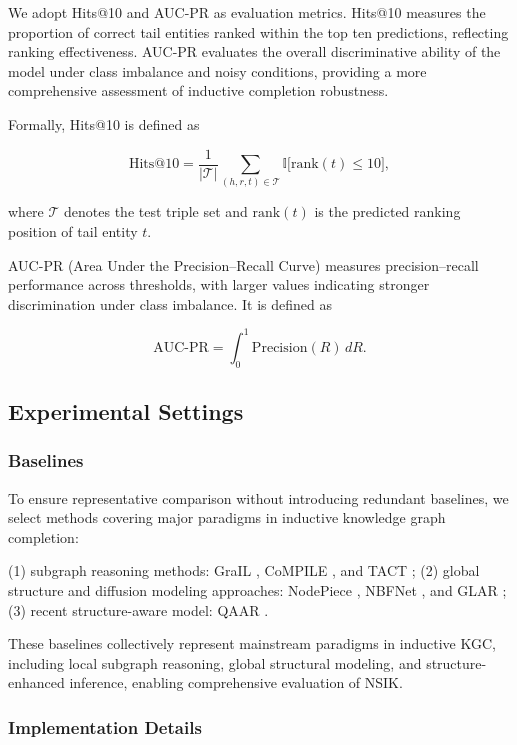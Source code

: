 \documentclass[preprint,12pt]{elsarticle}
\begin{document}
We adopt Hits@10 and AUC-PR as evaluation metrics. Hits@10 measures the proportion of correct tail entities ranked within the top ten predictions, reflecting ranking effectiveness. AUC-PR evaluates the overall discriminative ability of the model under class imbalance and noisy conditions, providing a more comprehensive assessment of inductive completion robustness.

Formally, Hits@10 is defined as

\[
\mathrm{Hits@10}=
\frac{1}{|\mathcal{T}|}
\sum_{(h,r,t)\in \mathcal{T}}
\mathbb{I}\bigl[\mathrm{rank}(t)\le 10\bigr],
\]

where $\mathcal{T}$ denotes the test triple set and $\mathrm{rank}(t)$ is the predicted ranking position of tail entity $t$.

AUC-PR (Area Under the Precision--Recall Curve) measures precision--recall performance across thresholds, with larger values indicating stronger discrimination under class imbalance. It is defined as

\[
\mathrm{AUC\text{-}PR}=\int_{0}^{1} \mathrm{Precision}(R)\, dR.
\]

\subsection{Experimental Settings}

\subsubsection{Baselines}

To ensure representative comparison without introducing redundant baselines, we select methods covering major paradigms in inductive knowledge graph completion:

(1) subgraph reasoning methods: GraIL \cite{subgraph-inductive-2020}, CoMPILE \cite{cmp}, and TACT \cite{topology-aware};  
(2) global structure and diffusion modeling approaches: NodePiece \cite{nodepiece}, NBFNet \cite{nbfnet}, and GLAR \cite{glar};  
(3) recent structure-aware model: QAAR \cite{query-anchor}.

These baselines collectively represent mainstream paradigms in inductive KGC, including local subgraph reasoning, global structural modeling, and structure-enhanced inference, enabling comprehensive evaluation of NSIK.

\subsubsection{Implementation Details}
\end{document}

